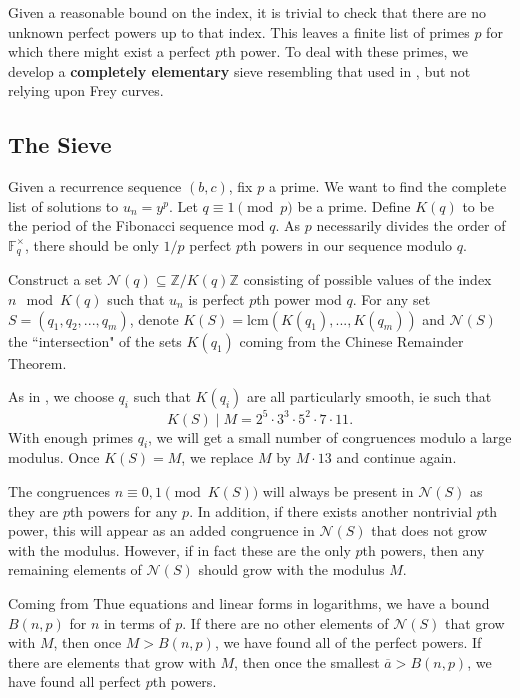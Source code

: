 \documentclass[12pt]{amsart}
\theoremstyle{definition}
\def\F{{\mathbb F}}
\def\N{{\mathcal N}}
\def\Z{{\mathbb Z}}
\newcommand{\lcm}{\text{lcm}}
\renewcommand{\bar}{\overline}
\begin{document}
Given a reasonable bound on the index, it is trivial to check that there are no unknown perfect powers up to that index.  This leaves a finite list of primes $p$ for which there might exist a perfect $p$th power.  To deal with these primes, we develop a \textbf{completely elementary} sieve resembling that used in \cite{siksek06}, but not relying upon Frey curves.

\subsection{The Sieve}

Given a recurrence sequence $(b,c)$, fix $p$ a prime.  We want to find the complete list of solutions to $u_n = y^p$.  Let $q \equiv 1 \pmod{p}$ be a prime.  Define $K(q)$ to be the period of the Fibonacci sequence mod $q$.  As $p$ necessarily divides the order of $\F_q^\times$, there should be only $1/p$ perfect $p$th powers in our sequence modulo $q$.  

Construct a set $\N(q) \subseteq \Z/K(q)\Z $ consisting of possible values of the index $n \mod{K(q)}$ such that $u_n$ is perfect $p$th power mod $q$.  For any set $S = (q_1,q_2,...,q_m)$, denote $K(S) = \lcm(K(q_1),...,K(q_m))$ and $\N(S)$ the ``intersection" of the sets $K(q_1)$ coming from the Chinese Remainder Theorem.


As in \cite{siksek06}, we choose $q_i$ such that $K(q_i)$ are all particularly smooth, ie such that 
\[K(S) \mid M = 2^5 \cdot 3^3 \cdot 5^2 \cdot 7 \cdot 11.\]
With enough primes $q_i$, we will get a small number of congruences modulo a large modulus.  Once $K(S) = M$, we replace $M$ by $M  \cdot 13$ and continue again. 

The congruences $n \equiv 0,1 \pmod{K(S)}$ will always be present in $\N(S)$ as they are $p$th powers for any $p$.  In addition, if there exists another nontrivial $p$th power, this will appear as an added congruence in $\N(S)$ that does not grow with the modulus.  However, if in fact these are the only $p$th powers, then any remaining elements of $\N(S)$ should grow with the modulus $M$.  

Coming from Thue equations and linear forms in logarithms, we have a bound $B(n,p)$ for $n$ in terms of $p$.  If there are no other elements of $\N(S)$ that grow with $M$, then once $M >B(n,p)$, we have found all of the perfect powers.  If there are elements that grow with $M$, then once the smallest $\bar{a} > B(n,p)$, we have found all perfect $p$th powers.
\end{document}
